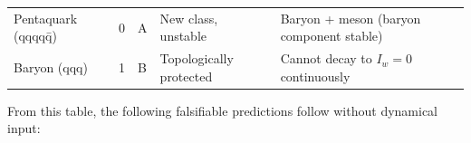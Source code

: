 \begin{longtable}[]{@{}lllll@{}}
\begin{minipage}[t]{0.17\columnwidth}\raggedright
Pentaquark (qqqqq̄)\strut
\end{minipage} & \begin{minipage}[t]{0.17\columnwidth}\raggedright
0\strut
\end{minipage} & \begin{minipage}[t]{0.17\columnwidth}\raggedright
A\strut
\end{minipage} & \begin{minipage}[t]{0.17\columnwidth}\raggedright
New class, unstable\strut
\end{minipage} & \begin{minipage}[t]{0.17\columnwidth}\raggedright
Baryon + meson (baryon component stable)\strut
\end{minipage}\tabularnewline
\begin{minipage}[t]{0.17\columnwidth}\raggedright
Baryon (qqq)\strut
\end{minipage} & \begin{minipage}[t]{0.17\columnwidth}\raggedright
1\strut
\end{minipage} & \begin{minipage}[t]{0.17\columnwidth}\raggedright
B\strut
\end{minipage} & \begin{minipage}[t]{0.17\columnwidth}\raggedright
Topologically protected\strut
\end{minipage} & \begin{minipage}[t]{0.17\columnwidth}\raggedright
Cannot decay to \(I_w = 0\) continuously\strut
\end{minipage}\tabularnewline
\bottomrule
\end{longtable}

From this table, the following falsifiable predictions follow without
dynamical input:

